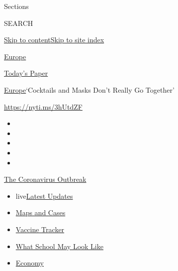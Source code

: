 Sections

SEARCH

\protect\hyperlink{site-content}{Skip to
content}\protect\hyperlink{site-index}{Skip to site index}

\href{https://www.nytimes3xbfgragh.onion/section/world/europe}{Europe}

\href{https://myaccount.nytimes3xbfgragh.onion/auth/login?response_type=cookie\&client_id=vi}{}

\href{https://www.nytimes3xbfgragh.onion/section/todayspaper}{Today's
Paper}

\href{/section/world/europe}{Europe}\textbar{}`Cocktails and Masks Don't
Really Go Together'

\url{https://nyti.ms/3hUtdZF}

\begin{itemize}
\item
\item
\item
\item
\item
\end{itemize}

\href{https://www.nytimes3xbfgragh.onion/news-event/coronavirus?action=click\&pgtype=Article\&state=default\&region=TOP_BANNER\&context=storylines_menu}{The
Coronavirus Outbreak}

\begin{itemize}
\tightlist
\item
  live\href{https://www.nytimes3xbfgragh.onion/2020/08/01/world/coronavirus-covid-19.html?action=click\&pgtype=Article\&state=default\&region=TOP_BANNER\&context=storylines_menu}{Latest
  Updates}
\item
  \href{https://www.nytimes3xbfgragh.onion/interactive/2020/us/coronavirus-us-cases.html?action=click\&pgtype=Article\&state=default\&region=TOP_BANNER\&context=storylines_menu}{Maps
  and Cases}
\item
  \href{https://www.nytimes3xbfgragh.onion/interactive/2020/science/coronavirus-vaccine-tracker.html?action=click\&pgtype=Article\&state=default\&region=TOP_BANNER\&context=storylines_menu}{Vaccine
  Tracker}
\item
  \href{https://www.nytimes3xbfgragh.onion/interactive/2020/07/29/us/schools-reopening-coronavirus.html?action=click\&pgtype=Article\&state=default\&region=TOP_BANNER\&context=storylines_menu}{What
  School May Look Like}
\item
  \href{https://www.nytimes3xbfgragh.onion/live/2020/07/31/business/stock-market-today-coronavirus?action=click\&pgtype=Article\&state=default\&region=TOP_BANNER\&context=storylines_menu}{Economy}
\end{itemize}

